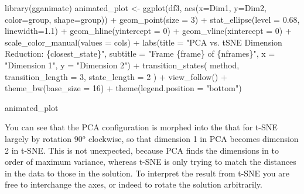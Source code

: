 \documentclass[
  letterpaper,
  10pt,
  krantz2]{krantz}
\makeatletter
\newenvironment{Shaded}{\begin{snugshade}}{\end{snugshade}}
\newcommand{\AttributeTok}[1]{\textcolor[rgb]{0.40,0.45,0.13}{#1}}
\newcommand{\DecValTok}[1]{\textcolor[rgb]{0.68,0.00,0.00}{#1}}
\newcommand{\FloatTok}[1]{\textcolor[rgb]{0.68,0.00,0.00}{#1}}
\newcommand{\FunctionTok}[1]{\textcolor[rgb]{0.28,0.35,0.67}{#1}}
\newcommand{\NormalTok}[1]{\textcolor[rgb]{0.00,0.23,0.31}{#1}}
\newcommand{\OtherTok}[1]{\textcolor[rgb]{0.00,0.23,0.31}{#1}}
\newcommand{\SpecialCharTok}[1]{\textcolor[rgb]{0.37,0.37,0.37}{#1}}
\newcommand{\StringTok}[1]{\textcolor[rgb]{0.13,0.47,0.30}{#1}}
\newenvironment{kframe}{%
  \medskip{}
  \setlength{\fboxsep}{.8em}
  \def\at@end@of@kframe{}%
  \ifinner\ifhmode%
  \def\at@end@of@kframe{\end{minipage}}%
  \begin{minipage}{\columnwidth}%
  \fi\fi%
  \def\FrameCommand##1{\hskip\@totalleftmargin \hskip-\fboxsep
  \colorbox{shadecolor}{##1}\hskip-\fboxsep
      \hskip-\linewidth \hskip-\@totalleftmargin \hskip\columnwidth}%
  \MakeFramed {\advance\hsize-\width
    \@totalleftmargin\z@ \linewidth\hsize
    \@setminipage}}%
{\par\unskip\endMakeFramed%
  \at@end@of@kframe}
\renewenvironment{Shaded}{\begin{kframe}}{\end{kframe}}
\makeatother
\begin{document}
\begin{Shaded}
\begin{Highlighting}[]
\FunctionTok{library}\NormalTok{(gganimate)}
\NormalTok{animated\_plot }\OtherTok{\textless{}{-}} 
  \FunctionTok{ggplot}\NormalTok{(df3, }\FunctionTok{aes}\NormalTok{(}\AttributeTok{x=}\NormalTok{Dim1, }\AttributeTok{y=}\NormalTok{Dim2, }\AttributeTok{color=}\NormalTok{group, }\AttributeTok{shape=}\NormalTok{group)) }\SpecialCharTok{+} 
  \FunctionTok{geom\_point}\NormalTok{(}\AttributeTok{size =} \DecValTok{3}\NormalTok{) }\SpecialCharTok{+} 
  \FunctionTok{stat\_ellipse}\NormalTok{(}\AttributeTok{level =} \FloatTok{0.68}\NormalTok{, }\AttributeTok{linewidth=}\FloatTok{1.1}\NormalTok{) }\SpecialCharTok{+}
  \FunctionTok{geom\_hline}\NormalTok{(}\AttributeTok{yintercept =} \DecValTok{0}\NormalTok{) }\SpecialCharTok{+}
  \FunctionTok{geom\_vline}\NormalTok{(}\AttributeTok{xintercept =} \DecValTok{0}\NormalTok{) }\SpecialCharTok{+}
  \FunctionTok{scale\_color\_manual}\NormalTok{(}\AttributeTok{values =}\NormalTok{ cols) }\SpecialCharTok{+}
  \FunctionTok{labs}\NormalTok{(}\AttributeTok{title =} \StringTok{"PCA vs. tSNE Dimension Reduction: \{closest\_state\}"}\NormalTok{,}
       \AttributeTok{subtitle =} \StringTok{"Frame \{frame\} of \{nframes\}"}\NormalTok{,}
       \AttributeTok{x =} \StringTok{"Dimension 1"}\NormalTok{,}
       \AttributeTok{y =} \StringTok{"Dimension 2"}\NormalTok{) }\SpecialCharTok{+} 
  \FunctionTok{transition\_states}\NormalTok{( method, }\AttributeTok{transition\_length =} \DecValTok{3}\NormalTok{, }\AttributeTok{state\_length =} \DecValTok{2}\NormalTok{ ) }\SpecialCharTok{+} 
  \FunctionTok{view\_follow}\NormalTok{() }\SpecialCharTok{+} 
  \FunctionTok{theme\_bw}\NormalTok{(}\AttributeTok{base\_size =} \DecValTok{16}\NormalTok{) }\SpecialCharTok{+}
  \FunctionTok{theme}\NormalTok{(}\AttributeTok{legend.position =} \StringTok{"bottom"}\NormalTok{) }

\NormalTok{animated\_plot}
\end{Highlighting}
\end{Shaded}

You can see that the PCA configuration is morphed into the that for
t-SNE largely by rotation 90\(^o\) clockwise, so that dimension 1 in PCA
becomes dimension 2 in t-SNE. This is not unexpected, because PCA finds
the dimensions in to order of maximum variance, whereas t-SNE is only
trying to match the distances in the data to those in the solution. To
interpret the result from t-SNE you are free to interchange the axes, or
indeed to rotate the solution arbitrarily.
\end{document}
